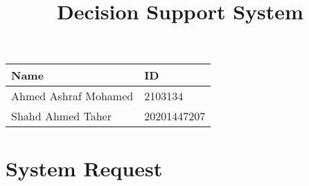 \documentclass[12pt]{article}
\title{Decision Support System}
\date{}
\begin{document}
\maketitle
\begin{center}
    \begin{tabular}{l l}
        \toprule
        Name                 & ID          \\
        \midrule
        Ahmed Ashraf Mohamed & 2103134     \\
        Shahd Ahmed Taher    & 20201447207 \\
        \bottomrule
    \end{tabular}
\end{center}


\newpage
\section{System Request}
\end{document}

